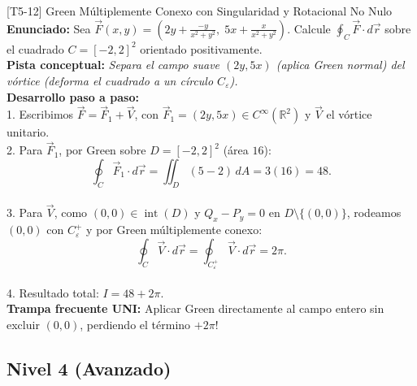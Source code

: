 \documentclass[11pt,a4paper]{article}
\begin{document}
\begin{ejerciciobox}{[T5-12] Green Múltiplemente Conexo con Singularidad y Rotacional No Nulo}
\textbf{Enunciado:} Sea $\vec{F}(x,y) = \left(2y + \frac{-y}{x^2+y^2},\; 5x + \frac{x}{x^2+y^2}\right)$. Calcule $\oint_C \vec{F}\cdot d\vec{r}$ sobre el cuadrado $C = [-2,2]^2$ orientado positivamente.\\[0.2cm]
\textbf{Pista conceptual:} \emph{Separa el campo suave $(2y, 5x)$ (aplica Green normal) del vórtice (deforma el cuadrado a un círculo $C_\varepsilon$).}\\[0.2cm]
\textbf{Desarrollo paso a paso:}\\
1. Escribimos $\vec{F} = \vec{F}_1 + \vec{V}$, con $\vec{F}_1 = (2y, 5x) \in C^\infty(\mathbb{R}^2)$ y $\vec{V}$ el vórtice unitario.\\
2. Para $\vec{F}_1$, por Green sobre $D = [-2,2]^2$ (área $16$):\\
$$\oint_C \vec{F}_1\cdot d\vec{r} = \iint_D (5 - 2)\,dA = 3(16) = 48.$$\\
3. Para $\vec{V}$, como $(0,0) \in \operatorname{int}(D)$ y $Q_x - P_y = 0$ en $D \setminus \{(0,0)\}$, rodeamos $(0,0)$ con $C_\varepsilon^+$ y por Green múltiplemente conexo:\\
$$\oint_C \vec{V}\cdot d\vec{r} = \oint_{C_\varepsilon^+} \vec{V}\cdot d\vec{r} = 2\pi.$$\\
4. Resultado total: $I = 48 + 2\pi$.\\[0.2cm]
\textbf{Trampa frecuente UNI:} Aplicar Green directamente al campo entero sin excluir $(0,0)$, perdiendo el término $+2\pi$!
\end{ejerciciobox}

\subsection{Nivel 4 (Avanzado)}
\end{document}
